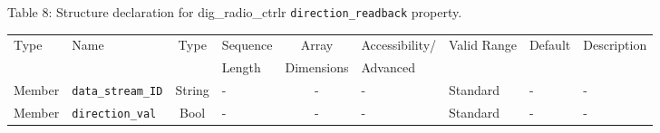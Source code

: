\documentclass{article}
\def\comp{dig\_radio\_ctrlr}
\begin{document}
\begin{landscape}
	\noindent Table \hypertarget{tab8}{8}: Structure declaration for \comp{} \verb+direction_readback+ property.
	\begin{scriptsize}
		\noindent\begin{longtable}{|p{1.8cm}|p{3.6cm}|c|p{4cm}|c|p{2cm}|p{1.7cm}|p{0.8cm}|p{4.81cm}|}
			\hline
			\rowcolor{blue}
			Type         & Name                                & Type & Sequence & Array      & Accessibility/ & Valid Range  & Default & Description                                                                                                                                                                                                                       \\
			\rowcolor{blue}
			             &                                     &      & Length   & Dimensions & Advanced       &              &         &                                                                                                                                                                                                                             \\
			\hline
			Member       & \verb+data_stream_ID+               & String& -       & -          & -              & Standard     & -       & - \\
			\hline
			Member       & \verb+direction_val+                & Bool& -       & -          & -              & Standard & -       & - \\
			\hline
		\end{longtable}
	\end{scriptsize}




\end{landscape}
\end{document}
